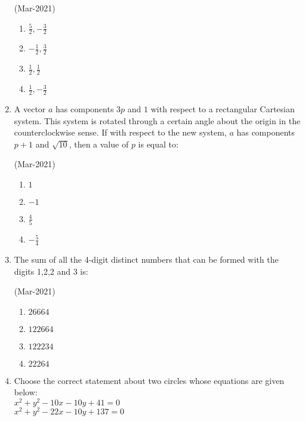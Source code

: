 \documentclass[journal,12pt,onecolumn]{IEEEtran}
\theoremstyle{remark}
\begin{document}
\begin{enumerate}
					\hfill{(Mar-2021)}
					\begin{multicols}{4}
                \begin{enumerate}
    \item $ \frac{5}{2}, -\frac{3}{2} $
    \item $ -\frac{1}{2}, \frac{3}{2} $
    \item $ \frac{1}{2}, \frac{1}{2} $
    \item $ \frac{1}{2}, -\frac{3}{2} $
                \end{enumerate}
					\end{multicols}
	\item
		A vector $a$ has components $3p$ and $1$ with respect to a rectangular Cartesian system. This system is rotated through a certain angle about the origin in the counterclockwise sense. If with respect to the new system, $a$ has components $p+1$ and $\sqrt{10}$, then a value of $p$ is equal to:

			\hfill{(Mar-2021)}
			\begin{multicols}{4}
		\begin{enumerate}
    \item $ 1 $
    \item $ -1 $
    \item $ \frac{4}{5} $
    \item $ -\frac{5}{4} $
                \end{enumerate}
			\end{multicols}
	\item
		The sum of all the 4-digit distinct numbers that can be formed with the digits 1,2,2 and 3 is:

			\hfill{(Mar-2021)}
			\begin{multicols}{2}
		\begin{enumerate}
    \item $ 26664 $
    \item $ 122664 $
    \item $ 122234 $
    \item $ 22264 $
                \end{enumerate}
			\end{multicols}
	\item
                Choose the correct statement about two circles whose equations are given below:\\
$ x^2 + y^2 - 10x - 10y + 41 = 0 $\\
$ x^2 + y^2 - 22x - 10y + 137 = 0 $\\


\end{enumerate}
\end{document}
